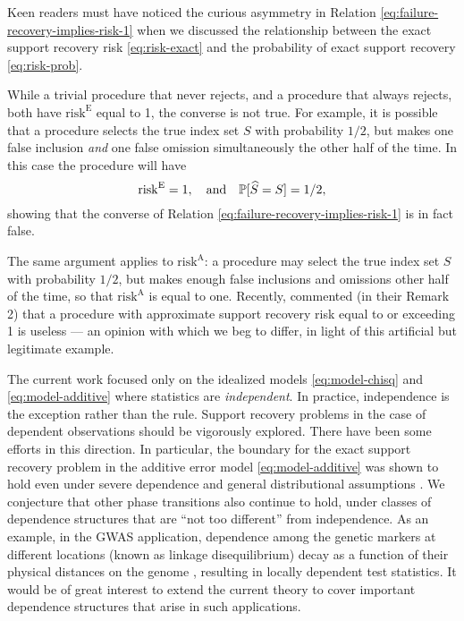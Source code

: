 \medskip

Keen readers must have noticed the curious asymmetry in Relation \eqref{eq:failure-recovery-implies-risk-1} when we discussed the relationship between the exact support recovery risk \eqref{eq:risk-exact} and the probability of exact support recovery \eqref{eq:risk-prob}.


While a trivial procedure that never rejects, and a procedure that always rejects, both have $\mathrm{risk}^{\mathrm{E}}$ equal to 1, the converse is not true.
For example, it is possible that a procedure selects the true index set $S$ with probability $1/2$, but makes one false inclusion \emph{and} one false omission simultaneously the other half of the time. 
In this case the procedure will have 
$$\mathrm{risk}^{\mathrm{E}} = 1, \quad \text{and} \quad \P[\widehat{S}=S] = 1/2,$$
showing that the converse of Relation \eqref{eq:failure-recovery-implies-risk-1} is in fact false.

The same argument applies to $\mathrm{risk}^{\mathrm{A}}$:
a procedure may select the true index set $S$ with probability $1/2$, but makes enough false inclusions and omissions other half of the time, so that $\mathrm{risk}^{\mathrm{A}}$ is equal to one.
Recently, \citet{arias2017distribution} commented (in their Remark 2) that a procedure with approximate support recovery risk equal to or exceeding 1 is useless --- an opinion with which we beg to differ, in light of this artificial but legitimate example.

\medskip

The current work focused only on the idealized models \eqref{eq:model-chisq} and \eqref{eq:model-additive} where statistics are \emph{independent}.
In practice, independence is the exception rather than the rule. 
Support recovery problems in the case of dependent observations should be vigorously explored.
There have been some efforts in this direction.
In particular, the boundary for the exact support recovery problem in the additive error model \eqref{eq:model-additive} was shown to hold even under severe dependence and general distributional assumptions \cite{gao2018fundamental}.
We conjecture that other phase transitions also continue to hold, under classes of dependence structures that are ``not too different'' from independence.
As an example, in the GWAS application, dependence among the genetic markers at different locations (known as linkage disequilibrium) decay as a function of their physical distances on the genome \cite{bush2012genome}, resulting in locally dependent test statistics.
It would be of great interest to extend the current theory to cover important dependence structures that arise in such applications.


